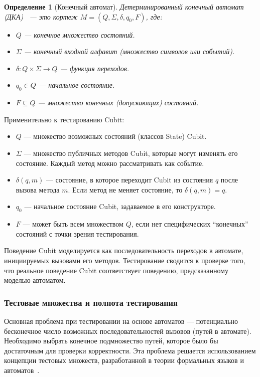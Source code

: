 \documentclass[14pt, russian]{scrartcl}
\newcommand{\enq}[1]{\enquote{#1}}
\newcounter{cDefinition}
\newtheorem{Definition}{Определение}[cDefinition]
\begin{document}
\begin{Definition}[Конечный автомат]
Детерминированный конечный автомат (ДКА)~\cite{AhoHopcroftUllman1974} — это кортеж $M = (Q, \Sigma, \delta, q_0, F)$, где:
\begin{itemize}
    \item $Q$ — конечное множество состояний.
    \item $\Sigma$ — конечный входной алфавит (множество символов или событий).
    \item $\delta: Q \times \Sigma \rightarrow Q$ — функция переходов.
    \item $q_0 \in Q$ — начальное состояние.
    \item $F \subseteq Q$ — множество конечных (допускающих) состояний.
\end{itemize}
\end{Definition}

Применительно к тестированию Cubit:
\begin{itemize}
    \item $Q$ — множество возможных состояний (классов State) Cubit.
    \item $\Sigma$ — множество публичных методов Cubit, которые могут изменять его состояние. Каждый метод можно рассматривать как событие.
    \item $\delta(q, m)$ — состояние, в которое переходит Cubit из состояния $q$ после вызова метода $m$. Если метод не меняет состояние, то $\delta(q, m) = q$.
    \item $q_0$ — начальное состояние Cubit, задаваемое в его конструкторе.
    \item $F$ — может быть всем множеством $Q$, если нет специфических \enq{конечных} состояний с точки зрения тестирования.
\end{itemize}

Поведение Cubit моделируется как последовательность переходов в автомате, инициируемых вызовами его методов. Тестирование сводится к проверке того, что реальное поведение Cubit соответствует поведению, предсказанному моделью-автоматом.

\subsubsection{Тестовые множества и полнота тестирования}

Основная проблема при тестировании на основе автоматов — потенциально бесконечное число возможных последовательностей вызовов (путей в автомате). Необходимо выбрать конечное подмножество путей, которое было бы достаточным для проверки корректности. Эта проблема решается использованием концепции тестовых множеств, разработанной в теории формальных языков и автоматов~\cite{AlbertCulikKarhumaki1982, JarominekKarhumakiRytterTCS}.
\end{document}
